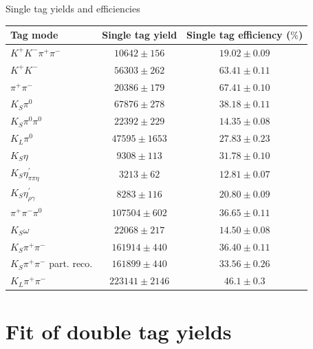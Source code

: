 \documentclass{beamer}
\begin{document}
\begin{frame}{Single tag yields and efficiencies}
  \begin{center}
    \begin{tabular}{lcc}
      Tag mode                          & Single tag yield     & Single tag efficiency ($\%$) \\
      \hline
      $K^+K^-\pi^+\pi^-$                & $10642 \pm 156$      & $19.02 \pm 0.09$     \\
      \hline
      $K^+K^-$                          & $56303 \pm 262$      & $63.41 \pm 0.11$     \\
      $\pi^+\pi^-$                      & $20386 \pm 179$      & $67.41 \pm 0.10$     \\
      $K_S\pi^0$                        & $67876 \pm 278$      & $38.18 \pm 0.11$     \\
      $K_S\pi^0\pi^0$                   & $22392 \pm 229$      & $14.35 \pm 0.08$     \\
      $K_L\pi^0$                        & $47595 \pm 1653$     & $27.83 \pm 0.23$     \\
      \hline
      $K_S\eta$                         & $9308 \pm 113$       & $31.78 \pm 0.10$     \\
      $K_S\eta^\prime_{\pi\pi\eta}$     & $3213 \pm 62$        & $12.81 \pm 0.07$     \\
      $K_S\eta^\prime_{\rho\gamma}$     & $8283 \pm 116$       & $20.80 \pm 0.09$     \\
      $\pi^+\pi^-\pi^0$                 & $107504 \pm 602$     & $36.65 \pm 0.11$     \\
      $K_S\omega$                       & $22068 \pm 217$      & $14.50 \pm 0.08$     \\
      \hline
      $K_S\pi^+\pi^-$                   & $161914 \pm 440$     & $36.40 \pm 0.11$     \\
      $K_S\pi^+\pi^-$ part. reco.       & $161899 \pm 440$     & $33.56 \pm 0.26$     \\
      $K_L\pi^+\pi^-$                   & $223141 \pm 2146$    & $46.1 \pm 0.3$       \\
      \hline
    \end{tabular}
  \end{center}
\end{frame}

\section{Fit of double tag yields}
\end{document}
